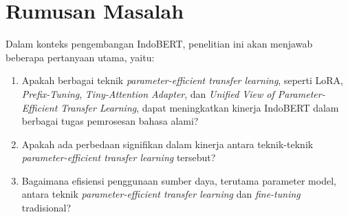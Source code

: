 \section{Rumusan Masalah}

Dalam konteks pengembangan IndoBERT, penelitian ini akan menjawab beberapa pertanyaan utama, yaitu:

\begin{enumerate}
    \item Apakah berbagai teknik \textit{parameter-efficient transfer learning}, seperti LoRA, \textit{Prefix-Tuning}, \textit{Tiny-Attention Adapter}, dan \textit{Unified View of Parameter-Efficient Transfer Learning}, dapat meningkatkan kinerja IndoBERT dalam berbagai tugas pemrosesan bahasa alami?
    \item Apakah ada perbedaan signifikan dalam kinerja antara teknik-teknik \textit{parameter-efficient transfer learning} tersebut?
    \item Bagaimana efisiensi penggunaan sumber daya, terutama parameter model, antara teknik \textit{parameter-efficient transfer learning} dan \textit{fine-tuning} tradisional?
\end{enumerate}